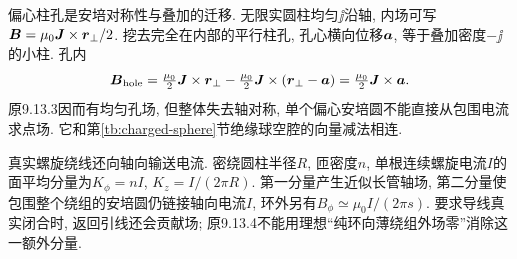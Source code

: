 偏心柱孔是安培对称性与叠加的迁移. 无限实圆柱均匀$\jj$沿轴, 内场可写$\boldsymbol{B}=\mu_0\boldsymbol{J}\times\boldsymbol{r}_\perp/2$. 挖去完全在内部的平行柱孔, 孔心横向位移$\boldsymbol{a}$, 等于叠加密度$-\jj$的小柱. 孔内
\[\boldsymbol{B}_{\rm hole}=\tfrac{\mu_0}2\boldsymbol{J}\times\boldsymbol{r}_\perp-\tfrac{\mu_0}2\boldsymbol{J}\times(\boldsymbol{r}_\perp-\boldsymbol{a})=\tfrac{\mu_0}2\boldsymbol{J}\times\boldsymbol{a}.\]
原9.13.3因而有均匀孔场, 但整体失去轴对称, 单个偏心安培圆不能直接从包围电流求点场. 它和第\ref{tb:charged-sphere}节绝缘球空腔的向量减法相连.

真实螺旋绕线还向轴向输送电流. 密绕圆柱半径$R$, 匝密度$n$, 单根连续螺旋电流$I$的面平均分量为$K_\phi=nI$, $K_z=I/(2\pi R)$. 第一分量产生近似长管轴场, 第二分量使包围整个绕组的安培圆仍链接轴向电流$I$, 环外另有$B_\phi\simeq\mu_0I/(2\pi s)$. 要求导线真实闭合时, 返回引线还会贡献场; 原9.13.4不能用理想“纯环向薄绕组外场零”消除这一额外分量.
